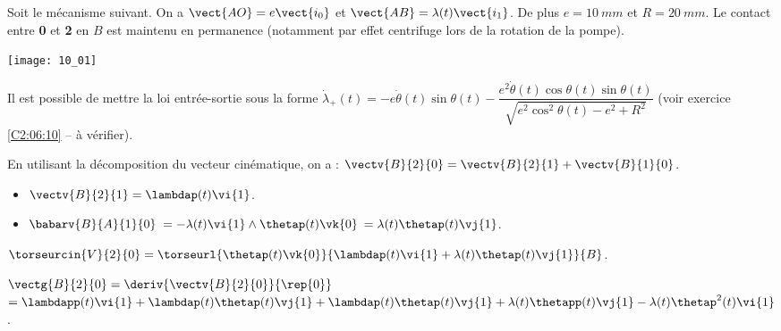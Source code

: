 \normaltrue \difficilefalse \tdifficilefalse
\correctiontrue

\setcounter{question}{0}
\ifcorrection
\else
{}
\fi

\ifprof
\else
Soit le mécanisme suivant. On a $\vect{AO}=e\vect{i_0}$ et $\vect{AB}=\lambda(t)\vect{i_1}$. De plus $e=\SI{10}{mm}$ et $R=\SI{20}{mm}$. Le contact entre \textbf{0} et \textbf{2} en $B$ est maintenu en permanence (notamment par effet centrifuge lors de la rotation de la pompe).
\begin{center}
\texttt{[image: 10\_01]}
\end{center}

Il est possible de mettre la loi entrée-sortie sous la forme 
$ \dot{\lambda}_{+}(t)= -e\dot{\theta}(t)\sin\theta(t)-  \dfrac{ e^2\dot{\theta}(t)\cos\theta(t)\sin\theta(t)}{ \sqrt{e^2\cos^2\theta(t)-e^2+R^2}}$
(voir exercice \ref{C2:06:10} -- à vérifier).

\fi



\ifprof

En utilisant la décomposition du vecteur cinématique, on a :
$\vectv{B}{2}{0} = \vectv{B}{2}{1}+\vectv{B}{1}{0}$.

\begin{itemize}
\item $\vectv{B}{2}{1} = \lambdap(t) \vi{1}$.
\item $\babarv{B}{A}{1}{0}$ $=-\lambda(t)\vi{1}\wedge\thetap(t)\vk{0}$ $=\lambda(t)\thetap(t)\vj{1}$.
\end{itemize}

$\torseurcin{V}{2}{0} = \torseurl{\thetap(t)\vk{0}}{\lambdap(t) \vi{1}+\lambda(t)\thetap(t)\vj{1}}{B}$.

\else
\fi


\ifprof

$\vectg{B}{2}{0} = \deriv{\vectv{B}{2}{0}}{\rep{0}}$
$= \lambdapp(t) \vi{1}+\lambdap(t) \thetap(t) \vj{1}+\lambdap(t)\thetap(t)\vj{1}+\lambda(t)\thetapp(t)\vj{1}-\lambda(t)\thetap^2(t)\vi{1} $.


\else
\fi


